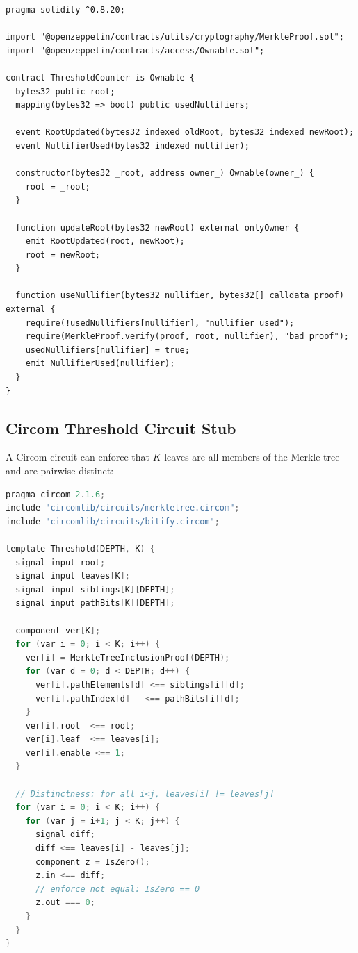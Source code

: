 \documentclass[11pt]{article}
\begin{document}
\begin{lstlisting}[style=code,language=Solidity,caption={ThresholdCounter contract (simplified).}]
pragma solidity ^0.8.20;

import "@openzeppelin/contracts/utils/cryptography/MerkleProof.sol";
import "@openzeppelin/contracts/access/Ownable.sol";

contract ThresholdCounter is Ownable {
  bytes32 public root;
  mapping(bytes32 => bool) public usedNullifiers;

  event RootUpdated(bytes32 indexed oldRoot, bytes32 indexed newRoot);
  event NullifierUsed(bytes32 indexed nullifier);

  constructor(bytes32 _root, address owner_) Ownable(owner_) {
    root = _root;
  }

  function updateRoot(bytes32 newRoot) external onlyOwner {
    emit RootUpdated(root, newRoot);
    root = newRoot;
  }

  function useNullifier(bytes32 nullifier, bytes32[] calldata proof) external {
    require(!usedNullifiers[nullifier], "nullifier used");
    require(MerkleProof.verify(proof, root, nullifier), "bad proof");
    usedNullifiers[nullifier] = true;
    emit NullifierUsed(nullifier);
  }
}
\end{lstlisting}

\subsection{Circom Threshold Circuit Stub}

A Circom circuit can enforce that $K$ leaves are all members of the Merkle tree and are pairwise distinct:

\begin{lstlisting}[style=code,language=C,caption={Threshold.circom stub.}]
pragma circom 2.1.6;
include "circomlib/circuits/merkletree.circom";
include "circomlib/circuits/bitify.circom";

template Threshold(DEPTH, K) {
  signal input root;
  signal input leaves[K];
  signal input siblings[K][DEPTH];
  signal input pathBits[K][DEPTH];

  component ver[K];
  for (var i = 0; i < K; i++) {
    ver[i] = MerkleTreeInclusionProof(DEPTH);
    for (var d = 0; d < DEPTH; d++) {
      ver[i].pathElements[d] <== siblings[i][d];
      ver[i].pathIndex[d]   <== pathBits[i][d];
    }
    ver[i].root  <== root;
    ver[i].leaf  <== leaves[i];
    ver[i].enable <== 1;
  }

  // Distinctness: for all i<j, leaves[i] != leaves[j]
  for (var i = 0; i < K; i++) {
    for (var j = i+1; j < K; j++) {
      signal diff;
      diff <== leaves[i] - leaves[j];
      component z = IsZero();
      z.in <== diff;
      // enforce not equal: IsZero == 0
      z.out === 0;
    }
  }
}
\end{lstlisting}
\end{document}
